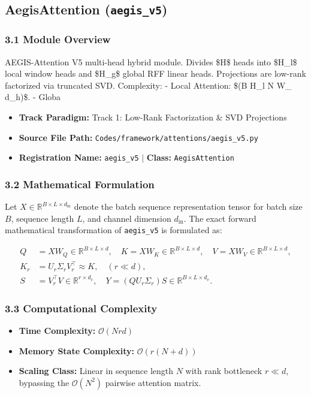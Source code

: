 \subsection{AegisAttention (\texttt{aegis\_v5})}
\label{sec:app_module_aegis_v5}

\subsubsection*{3.1 Module Overview}
AEGIS-Attention V5 multi-head hybrid module.  Divides \$H\$ heads into \$H\_l\$ local window heads and \$H\_g\$ global RFF linear heads. Projections are low-rank factorized via truncated SVD.  Complexity:     - Local Attention: \$(B \cdot H\_l \cdot N \cdot W\_{} \cdot d\_h)\$.     - Globa
\begin{itemize}
    \item \textbf{Track Paradigm:} Track 1: Low-Rank Factorization & SVD Projections
    \item \textbf{Source File Path:} \texttt{Codes/framework/attentions/aegis\_v5.py}
    \item \textbf{Registration Name:} \texttt{aegis\_v5} $\mid$ \textbf{Class:} \texttt{AegisAttention}
\end{itemize}

\subsubsection*{3.2 Mathematical Formulation}
Let $X \in \mathbb{R}^{B \times L \times d_{\text{in}}}$ denote the batch sequence representation tensor for batch size $B$, sequence length $L$, and channel dimension $d_{\text{in}}$. The exact forward mathematical transformation of \texttt{aegis\_v5} is formulated as:

\begin{align}
Q &= X W_Q \in \mathbb{R}^{B \times L \times d}, \quad K = X W_K \in \mathbb{R}^{B \times L \times d}, \quad V = X W_V \in \mathbb{R}^{B \times L \times d}, \\
K_r &= U_r \Sigma_r V_r^\top \approx K, \quad (r \ll d), \\
S &= V_r^\top V \in \mathbb{R}^{r \times d_v}, \quad Y = (Q U_r \Sigma_r) S \in \mathbb{R}^{B \times L \times d_v}.
\end{align}


\subsubsection*{3.3 Computational Complexity}
\begin{itemize}
    \item \textbf{Time Complexity:} $\mathcal{O}(N r d)$
    \item \textbf{Memory State Complexity:} $\mathcal{O}(r(N + d))$
    \item \textbf{Scaling Class:} Linear in sequence length $N$ with rank bottleneck $r \ll d$, bypassing the $\mathcal{O}(N^2)$ pairwise attention matrix.
\end{itemize}

